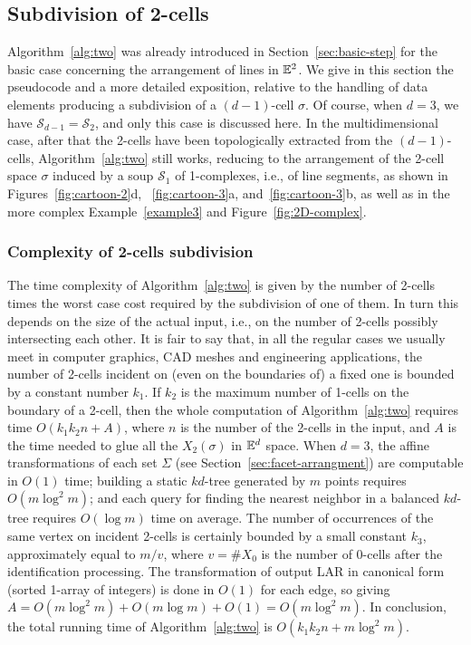 \subsection{{Subdivision} of 2-cells}
\label{sec:fragmentation}

Algorithm~\ref{alg:two} was already introduced in Section~\ref{sec:basic-step} for the basic case concerning the arrangement of lines in $\mathbb{E}^2$. We give in this section the pseudocode and a more detailed exposition, relative to the handling of data elements producing a {subdivision} of a $(d-1)$-cell $\sigma$.  Of course, when $d=3$, we have $\mathcal{S}_{d-1}=\mathcal{S}_2$, and only this case is discussed here. {In the multidimensional case}, after {that} the 2-cells have been topologically extracted from the $(d-1)$-cells, Algorithm~\ref{alg:two} still works,  reducing to the arrangement of the 2-cell space $\sigma$ induced by a soup $\mathcal{S}_1$ of 1-complexes, i.e., of line segments, as shown in Figures~\ref{fig:cartoon-2}d, ~\ref{fig:cartoon-3}a, and~\ref{fig:cartoon-3}b, as well as in the more complex  Example~\ref{example3} and Figure~\ref{fig:2D-complex}.



\subsubsection{Complexity of 2-cells {subdivision}}

The time complexity of Algorithm~\ref{alg:two} is given by the number of 2-cells times the worst case cost required by the {subdivision} of one of them. In turn this depends on the size of the actual input, i.e., on the number of 2-cells possibly intersecting each other. It is fair to say that, in all the regular cases we usually meet in computer graphics, CAD meshes and engineering applications, the number of 2-cells incident on (even on the boundaries of) a fixed one is bounded by a constant number $k_1$. If $k_2$ is the maximum number of 1-cells on the boundary of a 2-cell, then the whole computation of  Algorithm~\ref{alg:two} requires time $O(k_1 k_2 n + A)$, where $n$ is the number of the 2-cells in the input, and $A$ is the time needed to glue all the $X_2(\sigma)$ in $\mathbb{E}^d$ space.  When $d=3$, the affine transformations of each set $\Sigma$ (see Section~\ref{sec:facet-arrangment}) are computable in $O(1)$ time; building a static $kd$-tree generated by $m$ points requires $O(m \log^2 m)$; and each query for finding the nearest neighbor in a balanced $kd$-tree requires $O(\log m)$ time on average. The number of occurrences of the same vertex on incident 2-cells is certainly bounded by a small constant $k_3$, approximately equal to $m/v$, where $v=\#X_0$ is the number of 0-cells after the identification processing. The transformation of output LAR in canonical form (sorted 1-array of integers)  is done in $O(1)$ for each edge, so giving $A = O(m \log^2 m) + O(m\log m) + O(1) = O(m \log^2 m)$. In conclusion, {the total running time of Algorithm~\ref{alg:two} is}  $O(k_1 k_2 n + m \log^2 m)$.
 
